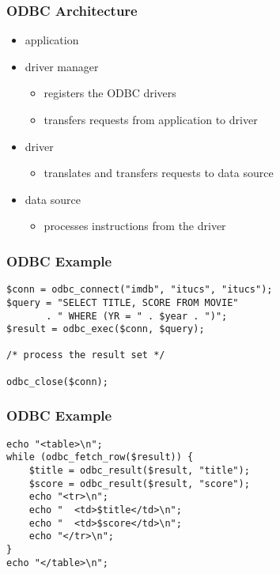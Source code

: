 \documentclass[dvipsnames]{beamer}
\theoremstyle{plain}
\begin{document}
\begin{frame}
  \frametitle{ODBC Architecture}

  \begin{itemize}
    \item application

    \pause
    \item driver manager
    \begin{itemize}
      \item registers the ODBC drivers
      \item transfers requests from application to driver
    \end{itemize}

    \pause
    \item driver
    \begin{itemize}
      \item translates and transfers requests to data source
    \end{itemize}

    \pause
    \item data source
    \begin{itemize}
      \item processes instructions from the driver
    \end{itemize}
  \end{itemize}
\end{frame}

\begin{frame}[fragile]
  \frametitle{ODBC Example}

  \begin{example}[PHP]
    \begin{lstlisting}
$conn = odbc_connect("imdb", "itucs", "itucs");
$query = "SELECT TITLE, SCORE FROM MOVIE"
       . " WHERE (YR = " . $year . ")";
$result = odbc_exec($conn, $query);

/* process the result set */

odbc_close($conn);
    \end{lstlisting}
  \end{example}
\end{frame}

\begin{frame}[fragile]
  \frametitle{ODBC Example}

  \begin{example}
    \begin{lstlisting}
echo "<table>\n";
while (odbc_fetch_row($result)) {
    $title = odbc_result($result, "title");
    $score = odbc_result($result, "score");
    echo "<tr>\n";
    echo "  <td>$title</td>\n";
    echo "  <td>$score</td>\n";
    echo "</tr>\n";
}
echo "</table>\n";
    \end{lstlisting}
  \end{example}
\end{frame}
\end{document}
